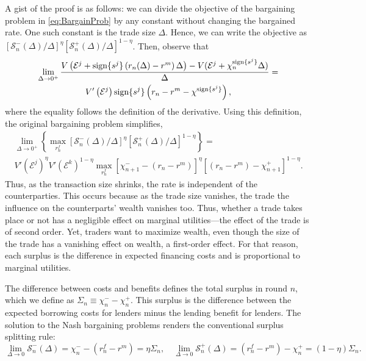 \documentclass[12pt,american,english,notitlepage]{article}
\begin{document}
A gist of the proof is as follows: we can divide the objective of
the bargaining problem in \eqref{eq:BargainProb} by any constant without
changing the bargained rate. One such constant is the trade size $\Delta$.
Hence, we can write the objective as $\left[\mathcal{S}_{n}^{-}(\Delta)/\Delta\right]^{\eta}\left[\mathcal{S}_{n}^{+}(\Delta)/\Delta\right]^{1-\eta}$.
Then, observe that
\begin{multline*}
\lim_{\Delta \rightarrow 0^+}\frac{V\left(\mathcal{E}^{j}+\text{sign}\{s^{j}\}\left(r_{n}(\Delta)-r^{m}\right)\Delta\right)-V(\mathcal{E}^{j}+\chi_{n}^{\text{sign}\{s^{j}\}}\Delta)}{\Delta}=\\
V'\left(\mathcal{E}^{j}\right)\text{sign}\{s^{j}\}\left(r_{n}-r^{m}-\chi^{\text{sign}\{s^{j}\}}\right),
\end{multline*}
where the equality follows the definition of the derivative. Using
this definition, the original bargaining problem simplifies,
\begin{multline*}
\lim_{\Delta \rightarrow 0^+}\left\{ \max_{r_{n}^{f}}\left[\mathcal{S}_{n}^{-}(\Delta)/\Delta\right]^{\eta}\left[\mathcal{S}_{n}^{+}(\Delta)/\Delta\right]^{1-\eta}\right\} =\\
V'\left(\mathcal{E}^{j}\right)^{\eta}V'\left(\mathcal{E}^{k}\right)^{1-\eta}\max_{r_{n}^{f}}\left[\chi_{n+1}^{-}-\left(r_{n}-r^{m}\right)\right]^{\eta}\left[\left(r_{n}-r^{m}\right)-\chi_{n+1}^{+}\right]^{1-\eta}.
\end{multline*}
Thus, as the transaction size shrinks, the rate is independent of
the counterparties. This occurs because as the trade size vanishes, the
trade the influence on the counterparts' wealth vanishes too. Thus, whether a trade takes place or not has a negligible effect on marginal utilities---the effect of the trade is of second order.
Yet, traders want to maximize wealth, even though the size of the trade has a vanishing effect on wealth, a first-order effect. For that reason, each surplus is the difference in expected financing costs and is proportional to marginal utilities.

The difference between costs and benefits defines the total surplus in round $n$, which we define as $\Sigma_{n}\equiv\chi_{n}^{-}-\chi_{n}^{+}.$ This surplus is the difference between the expected borrowing costs for
lenders minus the lending benefit for lenders. The solution to the Nash bargaining problems renders the conventional surplus splitting
rule:
\[
\lim_{\Delta\rightarrow0}\mathcal{S}_{n}^{-}(\Delta)=\chi_{n}^{-}-\left(r_{n}^{f}-r^{m}\right)=\eta\Sigma_{n},\quad\lim_{\Delta\rightarrow0}\mathcal{S}_{n}^{+}(\Delta)=\left(r_{n}^{f}-r^{m}\right)-\chi_{n}^{+}=\left(1-\eta\right)\Sigma_{n}.
\]
\end{document}
